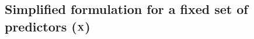\documentclass[11pt,a4paper,]{article}
\providecommand{\DIFaddbegin}{} %
\providecommand{\DIFaddend}{} %
\providecommand{\DIFdelbegin}{} %
\providecommand{\DIFdelend}{} %
\newcommand{\DIFscaledelfig}{0.5}
\newlength{\DIFdelgraphicswidth} %
\newlength{\DIFdelgraphicsheight} %
\newcommand{\DIFaddincludegraphics}[2][]{{\color{blue}\fbox{\DIFOincludegraphics[#1]{#2}}}} %
\newcommand{\DIFdelincludegraphics}[2][]{%
\sbox{\DIFdelgraphicsbox}{\DIFOincludegraphics[#1]{#2}}%
\settoboxwidth{\DIFdelgraphicswidth}{\DIFdelgraphicsbox} %
\settoboxtotalheight{\DIFdelgraphicsheight}{\DIFdelgraphicsbox} %
\scalebox{\DIFscaledelfig}{%
\parbox[b]{\DIFdelgraphicswidth}{\usebox{\DIFdelgraphicsbox}\\[-\baselineskip] \rule{\DIFdelgraphicswidth}{0em}}\llap{\resizebox{\DIFdelgraphicswidth}{\DIFdelgraphicsheight}{%
\setlength{\unitlength}{\DIFdelgraphicswidth}%
\begin{picture}(1,1)%
\thicklines\linethickness{2pt} %
{\color[rgb]{1,0,0}\put(0,0){\framebox(1,1){}}}%
{\color[rgb]{1,0,0}\put(0,0){\line( 1,1){1}}}%
{\color[rgb]{1,0,0}\put(0,1){\line(1,-1){1}}}%
\end{picture}%
}\hspace*{3pt}}} %
} %
\DeclareRobustCommand{\DIFaddbegin}{\DIFOaddbegin \let\includegraphics\DIFaddincludegraphics} %
\DeclareRobustCommand{\DIFaddend}{\DIFOaddend \let\includegraphics\DIFOincludegraphics} %
\DeclareRobustCommand{\DIFdelbegin}{\DIFOdelbegin \let\includegraphics\DIFdelincludegraphics} %
\DeclareRobustCommand{\DIFdelend}{\DIFOaddend \let\includegraphics\DIFOincludegraphics} %
\begin{document}
\DIFdelbegin %
\DIFdelend \DIFaddbegin \hypertarget{simplified-formulation-for-a-fixed-set-of-predictors-bf-x}{%
\subsection{\texorpdfstring{Simplified formulation for a fixed set of predictors (\(\bf {X}\)) \label{sec:proposedapproach2}}{Simplified formulation for a fixed set of predictors (\textbackslash bf \{X\}) }}\label{simplified-formulation-for-a-fixed-set-of-predictors-bf-x}}
\DIFaddend
\end{document}
